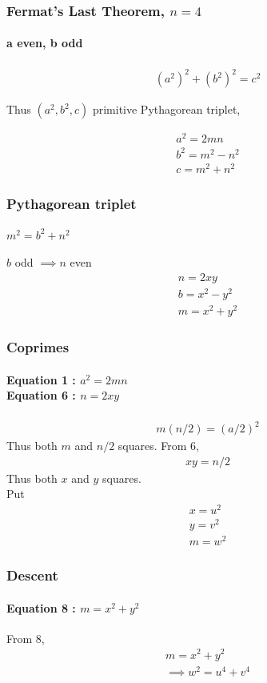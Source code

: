 \documentclass{beamer}
\begin{document}
\begin{frame}
    \frametitle{Fermat's Last Theorem, $n = 4$}
    \framesubtitle{a even, b odd}
    \begin{gather*}
        (a^2)^2 + (b^2)^2 = c^2
    \end{gather*}

    Thus $(a^2, b^2, c)$ primitive Pythagorean triplet,

    \begin{gather}
        a^2 = 2mn\\
        b^2 = m^2 - n^2\\
        c = m^2 + n^2
    \end{gather}
\end{frame}

\begin{frame}
    \frametitle{Pythagorean triplet}
    \framesubtitle{$m^2 = b^2 + n^2$}
    $b$ odd $\implies n$ even
    \begin{gather}
        n = 2xy\\
        b = x^2 - y^2\\
        m = x^2 + y^2
    \end{gather}
\end{frame}

\begin{frame}
    \frametitle{Coprimes}
    \framesubtitle{Equation 1 : $a^2=2mn$\\Equation 6 : $n = 2xy$}
    \begin{gather}
        m(n/2) = (a/2)^2
    \end{gather}
    Thus both $m$ and $n/2$ squares. From 6,
    \begin{gather}
        xy = n/2
    \end{gather}
    Thus both $x$ and $y$ squares.\\
    Put
    \begin{gather}
        x = u^2\\
        y = v^2\\
        m = w^2
    \end{gather}
\end{frame}

\begin{frame}
    \frametitle{Descent}
    \framesubtitle{Equation 8 : $m = x^2+ y^2$}
    From 8,
    \begin{gather}
        m = x^2+y^2\\
        \implies w^2 = u^4 + v^4
    \end{gather}
\end{frame}
\end{document}
